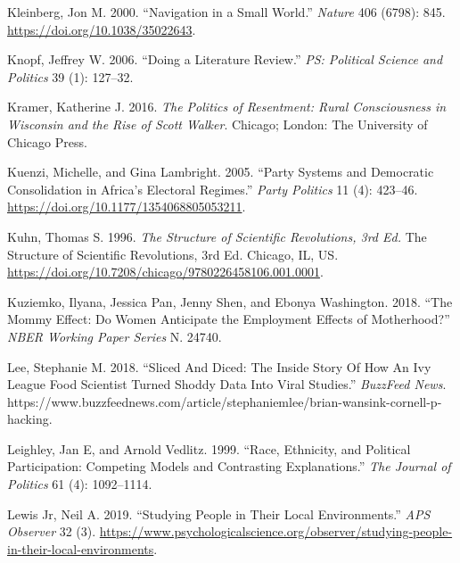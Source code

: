 \documentclass{book}
\newlength{\cslhangindent}
\newlength{\cslentryspacingunit} %
\newenvironment{CSLReferences}[2] %
 {%
  \setlength{\parindent}{0pt}
  \ifodd #1
  \let\oldpar\par
  \def\par{\hangindent=\cslhangindent\oldpar}
  \fi
  \setlength{\parskip}{#2\cslentryspacingunit}
 }%
 {}
\begin{document}
\begin{CSLReferences}{1}{0}
\leavevmode{}%
Kleinberg, Jon M. 2000. {``Navigation in a Small World.''} \emph{Nature} 406
(6798): 845. \url{https://doi.org/10.1038/35022643}.

\leavevmode{}%
Knopf, Jeffrey W. 2006. {``Doing a {Literature Review}.''} \emph{PS: Political
Science and Politics} 39 (1): 127--32.

\leavevmode{}%
Kramer, Katherine J. 2016. \emph{The Politics of Resentment: Rural
Consciousness in Wisconsin and the Rise of Scott Walker}. Chicago; London: The
University of Chicago Press.

\leavevmode{}%
Kuenzi, Michelle, and Gina Lambright. 2005. {``Party {Systems} and {Democratic
Consolidation} in {Africa}'s {Electoral Regimes}.''} \emph{Party Politics} 11
(4): 423--46. \url{https://doi.org/10.1177/1354068805053211}.

\leavevmode{}%
Kuhn, Thomas S. 1996. \emph{The Structure of Scientific Revolutions, 3rd Ed.}
The Structure of Scientific Revolutions, 3rd Ed. {Chicago, IL, US}.
\url{https://doi.org/10.7208/chicago/9780226458106.001.0001}.

\leavevmode{}%
Kuziemko, Ilyana, Jessica Pan, Jenny Shen, and Ebonya Washington. 2018. {``The
{Mommy Effect}: {Do Women Anticipate} the {Employment Effects} of
{Motherhood}?''} \emph{NBER Working Paper Series} N. 24740.

\leavevmode{}%
Lee, Stephanie M. 2018. {``Sliced {And Diced}: {The Inside Story Of How An Ivy
League Food Scientist Turned Shoddy Data Into Viral Studies}.''}
\emph{BuzzFeed News}.
https://www.buzzfeednews.com/article/stephaniemlee/brian-wansink-cornell-p-hacking.

\leavevmode{}%
Leighley, Jan E, and Arnold Vedlitz. 1999. {``Race, Ethnicity, and Political
Participation: Competing Models and Contrasting Explanations.''} \emph{The
Journal of Politics} 61 (4): 1092--1114.

\leavevmode{}%
Lewis Jr, Neil A. 2019. {``Studying {People} in {Their} {Local}
{Environments}.''} \emph{APS Observer} 32 (3).
\url{https://www.psychologicalscience.org/observer/studying-people-in-their-local-environments}.


\end{CSLReferences}
\end{document}

